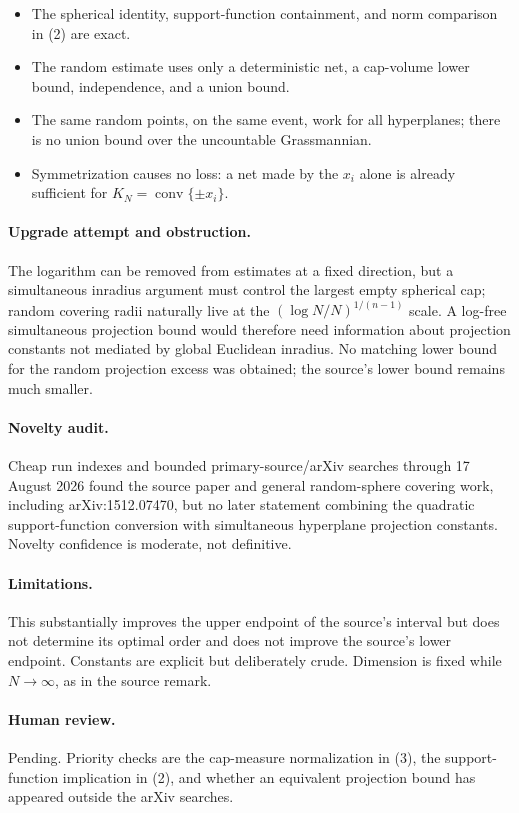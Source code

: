 \documentclass[11pt]{article}
\newcommand{\conv}{\operatorname{conv}}
\begin{document}
\begin{itemize}
\item The spherical identity, support-function containment, and norm
comparison in (2) are exact.
\item The random estimate uses only a deterministic net, a cap-volume lower
bound, independence, and a union bound.
\item The same random points, on the same event, work for all hyperplanes;
there is no union bound over the uncountable Grassmannian.
\item Symmetrization causes no loss: a net made by the \(x_i\) alone is
already sufficient for \(K_N=\conv\{\pm x_i\}\).
\end{itemize}

\paragraph{Upgrade attempt and obstruction.}
The logarithm can be removed from estimates at a fixed direction, but a
simultaneous inradius argument must control the largest empty spherical cap;
random covering radii naturally live at the
\((\log N/N)^{1/(n-1)}\) scale.  A log-free simultaneous projection bound
would therefore need information about projection constants not mediated by
global Euclidean inradius.  No matching lower bound for the random
projection excess was obtained; the source's lower bound remains much
smaller.

\paragraph{Novelty audit.}
Cheap run indexes and bounded primary-source/arXiv searches through
17 August 2026 found the source paper and general random-sphere covering
work, including arXiv:1512.07470, but no later statement combining the
quadratic support-function conversion with simultaneous hyperplane
projection constants.  Novelty confidence is moderate, not definitive.

\paragraph{Limitations.}
This substantially improves the upper endpoint of the source's interval but
does not determine its optimal order and does not improve the source's lower
endpoint.  Constants are explicit but deliberately crude.  Dimension is
fixed while \(N\to\infty\), as in the source remark.

\paragraph{Human review.}
Pending.  Priority checks are the cap-measure normalization in (3), the
support-function implication in (2), and whether an equivalent projection
bound has appeared outside the arXiv searches.
\end{document}
